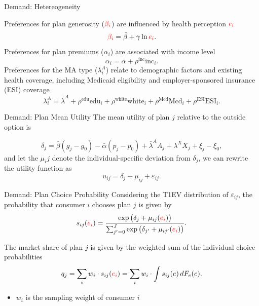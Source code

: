 \documentclass[professionalfonts, aspectratio=169]{beamer}
\begin{document}
\begin{frame}{Demand: Hetereogeneity}

  Preferences for plan generosity ($\textcolor{red}{\beta_i}$) are influenced by health perception $\textcolor{red}{e_i}$
  \begin{equation}
      \textcolor{red}{\beta_i} = \bar{\beta} + \gamma \ln \textcolor{red}{e_i}.
  \end{equation}
  Preferences for plan premiums ($\alpha_i$) are associated with income level
  \begin{equation}
      \alpha_i = \bar{\alpha} + \rho^{\text{inc}} \text{inc}_i.
  \end{equation}
  Preferences for the MA type ($\lambda^{A}_i$) relate to demographic factors and existing health coverage, including Medicaid eligibility and employer-sponsored insurance (ESI) coverage
  \begin{equation}
      \lambda^{A}_i = \bar{\lambda}^{A} + \rho^{\text{edu}} \text{edu}_i + \rho^{\text{white}} \text{white}_i + \rho^{\text{Mcd}} \text{Mcd}_i + \rho^{\text{ESI}} \text{ESI}_i.
  \end{equation}
  
\end{frame}

\begin{frame}{Demand: Plan Mean Utility}
  The mean utility of plan $j$ relative to the outside option is

  \begin{equation}
    \delta_j = \bar{\beta} (g_j - g_0) - \bar{\alpha} (p_j - p_0) + \bar{\lambda}^{A} A_j + \lambda^X X_j + \xi_j - \xi_0,
  \end{equation}
  and let the $\mu_ij$ denote the individual-specific deviation from $\delta_j$, we can rewrite the utility function as
  \begin{equation}
    u_{ij} = \delta_j + \mu_{ij} + \varepsilon_{ij}.
  \end{equation}

\end{frame}

\begin{frame}{Demand: Plan Choice Probability}
  Considering the T1EV distribution of $\varepsilon_{ij}$, the probability that consumer $i$ chooses plan $j$ is given by
  \begin{equation}
    s_{ij}(\textcolor{red}{e_i}) = 
    \frac{\exp \big(\delta_j + \mu_{ij}(\textcolor{red}{e_i}) \big)}
    {\sum_{j' = 0}^{J}  \exp \big(\delta_{j'} + \mu_{ij'}(\textcolor{red}{e_i}) \big)}.
  \end{equation}

  The market share of plan $j$ is given by the weighted sum of the individual choice probabilities
  \begin{equation}
    q_j = \sum_i w_i \cdot s_{ij}(\textcolor{red}{e_i}) = \sum_i w_i \cdot \int s_{ij}(e) \, dF_{e}(e).
\end{equation}
\begin{itemize}\small
  \item $w_i$ is the sampling weight of consumer $i$
\end{itemize}

\end{frame}
\end{document}
